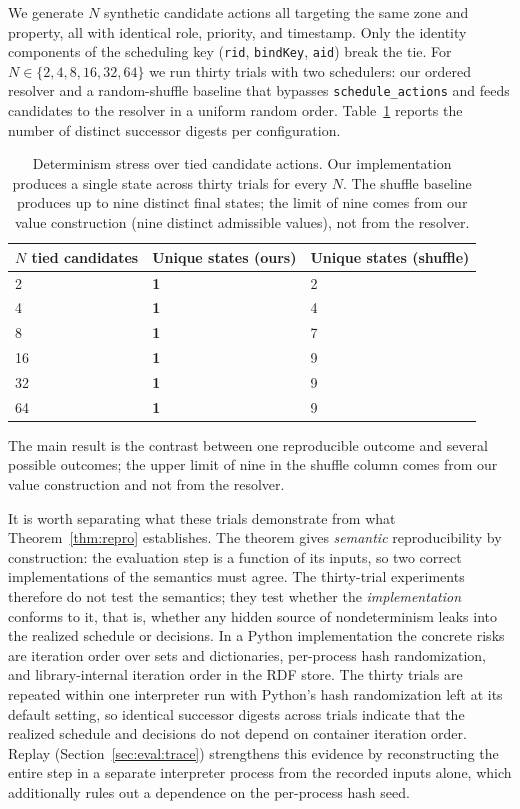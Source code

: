 \documentclass{ieeeaccess}
\theoremstyle{definition}
\theoremstyle{plain}
\theoremstyle{remark}
\begin{document}
We generate $N$ synthetic candidate actions all targeting the same zone and property, all with identical role, priority, and timestamp. Only the identity components of the scheduling key (\texttt{rid}, \texttt{bindKey}, \texttt{aid}) break the tie. For $N \in \{2, 4, 8, 16, 32, 64\}$ we run thirty trials with two schedulers: our ordered resolver and a random-shuffle baseline that bypasses \texttt{schedule\_actions} and feeds candidates to the resolver in a uniform random order. Table~\ref{tab:determinism} reports the number of distinct successor digests per configuration.

\begin{table}[t]
\caption{Determinism stress over tied candidate actions. Our implementation produces a single state across thirty trials for every $N$. The shuffle baseline produces up to nine distinct final states; the limit of nine comes from our value construction (nine distinct admissible values), not from the resolver.}
\label{tab:determinism}
\centering
\small
\begin{tabular}{|p{2.8cm}|p{2.2cm}|p{2.2cm}|}
\hline
\textbf{$N$ tied candidates} & \textbf{Unique states (ours)} & \textbf{Unique states (shuffle)} \\
\hline
 2 & \textbf{1} & 2 \\
\hline
 4 & \textbf{1} & 4 \\
\hline
 8 & \textbf{1} & 7 \\
\hline
16 & \textbf{1} & 9 \\
\hline
32 & \textbf{1} & 9 \\
\hline
64 & \textbf{1} & 9 \\
\hline
\end{tabular}
\end{table}

The main result is the contrast between one reproducible outcome and several possible outcomes; the upper limit of nine in the shuffle column comes from our value construction and not from the resolver.

It is worth separating what these trials demonstrate from what Theorem~\ref{thm:repro} establishes. The theorem gives \emph{semantic} reproducibility by construction: the evaluation step is a function of its inputs, so two correct implementations of the semantics must agree. The thirty-trial experiments therefore do not test the semantics; they test whether the \emph{implementation} conforms to it, that is, whether any hidden source of nondeterminism leaks into the realized schedule or decisions. In a Python implementation the concrete risks are iteration order over sets and dictionaries, per-process hash randomization, and library-internal iteration order in the RDF store. The thirty trials are repeated within one interpreter run with Python's hash randomization left at its default setting, so identical successor digests across trials indicate that the realized schedule and decisions do not depend on container iteration order. Replay (Section~\ref{sec:eval:trace}) strengthens this evidence by reconstructing the entire step in a separate interpreter process from the recorded inputs alone, which additionally rules out a dependence on the per-process hash seed.
\end{document}
